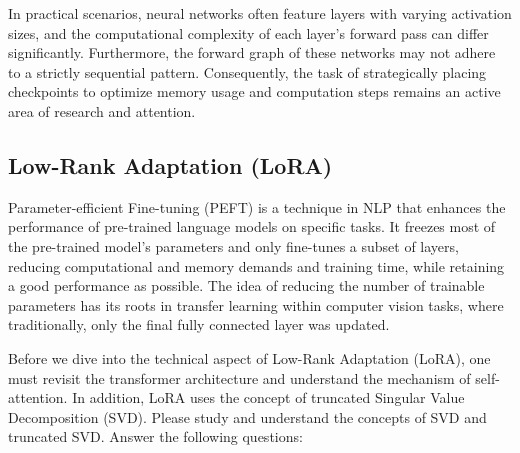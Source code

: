 In practical scenarios, neural networks often feature layers with varying activation sizes, and the computational complexity of each layer's forward pass can differ significantly. Furthermore, the forward graph of these networks may not adhere to a strictly sequential pattern. Consequently, the task of strategically placing checkpoints to optimize memory usage and computation steps remains an active area of research and attention. 


\subsection{Low-Rank Adaptation (LoRA)}

Parameter-efficient Fine-tuning (PEFT) is a technique in NLP that enhances the performance of pre-trained language models on specific tasks. It freezes most of the pre-trained model's parameters and only fine-tunes a subset of layers, reducing computational and memory demands and training time, while retaining a good performance as possible. The idea of reducing the number of trainable parameters has its roots in transfer learning within computer vision tasks, where traditionally, only the final fully connected layer was updated.

Before we dive into the technical aspect of Low-Rank Adaptation (LoRA), one must revisit the transformer architecture and understand the mechanism of self-attention. In addition, LoRA uses the concept of truncated Singular Value Decomposition (SVD). Please study and understand the concepts of SVD and truncated SVD. Answer the following questions:

